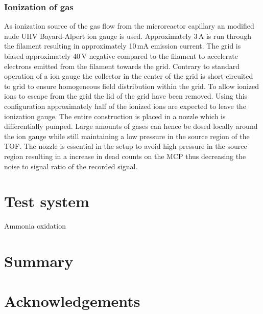 \documentclass[11pt]{article}
\begin{document}
\subsubsection{Ionization of gas}
As ionization source of the gas flow from the microreactor capillary an modified nude UHV Bayard-Alpert ion gauge is used. Approximately 3\,A is run through the filament resulting in approximately 10\,mA emission current. The grid is biased approximately 40\,V negative compared to the filament to accelerate electrons emitted from the filament towards the grid. Contrary to standard operation of a ion gauge the collector in the center of the grid is short-circuited to grid to ensure homogeneous field distribution within the grid. To allow ionized ions to escape from the grid the lid of the grid have been removed. Using this configuration approximately half of the ionized ions are expected to leave the ionization gauge. The entire construction is placed in a nozzle which is differentially pumped. Large amounts of gases can hence be dosed locally around the ion gauge while still maintaining a low pressure in the source region of the TOF. The nozzle is essential in the setup to avoid high pressure in the source region resulting in a increase in dead counts on the MCP thus decreasing the noise to signal ratio of the recorded signal.

\section{Test system}
Ammonia oxidation

\section{Summary}

\section{Acknowledgements}



\end{document}
